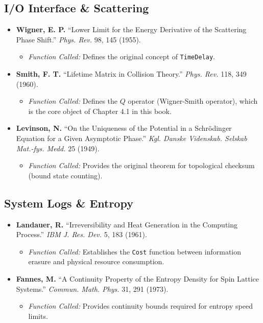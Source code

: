 \documentclass[11pt,a4paper,twoside]{book}
\begin{document}
\subsection{I/O Interface \& Scattering}

\begin{itemize}
\item \textbf{Wigner, E. P.} ``Lower Limit for the Energy Derivative of the Scattering Phase Shift.'' \textit{Phys. Rev.} 98, 145 (1955).

\begin{itemize}
\item \textit{Function Called:} Defines the original concept of \texttt{TimeDelay}.
\end{itemize}

\item \textbf{Smith, F. T.} ``Lifetime Matrix in Collision Theory.'' \textit{Phys. Rev.} 118, 349 (1960).

\begin{itemize}
\item \textit{Function Called:} Defines the $Q$ operator (Wigner-Smith operator), which is the core object of Chapter 4.1 in this book.
\end{itemize}

\item \textbf{Levinson, N.} ``On the Uniqueness of the Potential in a Schrödinger Equation for a Given Asymptotic Phase.'' \textit{Kgl. Danske Videnskab. Selskab Mat.-fys. Medd.} 25 (1949).

\begin{itemize}
\item \textit{Function Called:} Provides the original theorem for topological checksum (bound state counting).
\end{itemize}
\end{itemize}

\subsection{System Logs \& Entropy}

\begin{itemize}
\item \textbf{Landauer, R.} ``Irreversibility and Heat Generation in the Computing Process.'' \textit{IBM J. Res. Dev.} 5, 183 (1961).

\begin{itemize}
\item \textit{Function Called:} Establishes the \texttt{Cost} function between information erasure and physical resource consumption.
\end{itemize}

\item \textbf{Fannes, M.} ``A Continuity Property of the Entropy Density for Spin Lattice Systems.'' \textit{Commun. Math. Phys.} 31, 291 (1973).

\begin{itemize}
\item \textit{Function Called:} Provides continuity bounds required for entropy speed limits.
\end{itemize}
\end{itemize}
\end{document}
